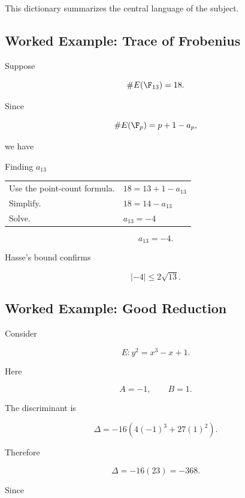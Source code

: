 This dictionary summarizes the central language of the subject.

\subsection{Worked Example: Trace of Frobenius}
\label{subsec:worked-trace-frobenius}

Suppose

\[ \#E(\F_{13})=18. \]

Since

\[ \#E(\F_p)=p+1-a_p, \]

we have

\begin{workedexamplebox}{Finding \(a_{13}\)}

\begin{tabularx}{\textwidth}{@{}>{\raggedright\arraybackslash}p{}X@{}}
Use the point-count formula. & \(18=13+1-a_{13}\)\\
Simplify. & \(18=14-a_{13}\)\\
Solve. & \(a_{13}=-4\)
\end{tabularx}

\begin{answerbox}
\[ \boxed{a_{13}=-4.} \]
\end{answerbox}
\end{workedexamplebox}

Hasse's bound confirms

\[ |-4|\leq2\sqrt{13}. \]

\subsection{Worked Example: Good Reduction}
\label{subsec:worked-good-reduction}

Consider

\[ E:y^2=x^3-x+1. \]

Here

\[ A=-1,\qquad B=1. \]

The discriminant is

\[ \Delta=-16(4(-1)^3+27(1)^2). \]

Therefore

\[ \Delta=-16(23)=-368. \]

Since

